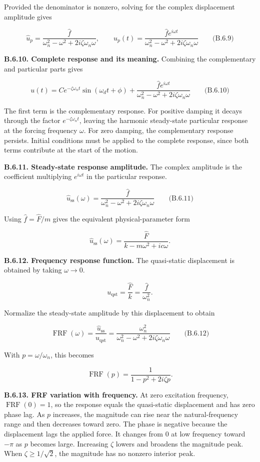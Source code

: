 Provided the denominator is nonzero, solving for the complex displacement amplitude gives

\[
\boxed{
\hat{u}_p=\frac{\hat{f}}
{\omega_n^2-\omega^2+2i\zeta\omega_n\omega},
\qquad
u_p(t)=\frac{\hat{f}e^{i\omega t}}
{\omega_n^2-\omega^2+2i\zeta\omega_n\omega}
}
\qquad\text{(B.6.9)}
\]

\textbf{B.6.10. Complete response and its meaning.} Combining the complementary and particular parts gives

\[
\boxed{
u(t)=Ce^{-\zeta\omega_nt}\sin(\omega_dt+\phi)
+\frac{\hat{f}e^{i\omega t}}
{\omega_n^2-\omega^2+2i\zeta\omega_n\omega}
}
\qquad\text{(B.6.10)}
\]

The first term is the complementary response. For positive damping it decays through the factor $e^{-\zeta\omega_nt}$, leaving the harmonic steady-state particular response at the forcing frequency $\omega$. For zero damping, the complementary response persists. Initial conditions must be applied to the complete response, since both terms contribute at the start of the motion.

\textbf{B.6.11. Steady-state response amplitude.} The complex amplitude is the coefficient multiplying $e^{i\omega t}$ in the particular response.

\[
\boxed{
\hat{u}_{\mathrm{ss}}(\omega)=
\frac{\hat{f}}
{\omega_n^2-\omega^2+2i\zeta\omega_n\omega}
}
\qquad\text{(B.6.11)}
\]

Using $\hat{f}=\hat{F}/m$ gives the equivalent physical-parameter form

\[
\hat{u}_{\mathrm{ss}}(\omega)=
\frac{\hat{F}}{k-m\omega^2+ic\omega}.
\]

\textbf{B.6.12. Frequency response function.} The quasi-static displacement is obtained by taking $\omega\to0$.

\[
u_{\mathrm{qst}}=\frac{\hat{F}}{k}=\frac{\hat{f}}{\omega_n^2}.
\]

Normalize the steady-state amplitude by this displacement to obtain

\[
\boxed{
\operatorname{FRF}(\omega)=\frac{\hat{u}_{\mathrm{ss}}}{u_{\mathrm{qst}}}
=\frac{\omega_n^2}
{\omega_n^2-\omega^2+2i\zeta\omega_n\omega}
}
\qquad\text{(B.6.12)}
\]

With $p=\omega/\omega_n$, this becomes

\[
\operatorname{FRF}(p)=\frac{1}{1-p^2+2i\zeta p}.
\]

\textbf{B.6.13. FRF variation with frequency.} At zero excitation frequency, $\operatorname{FRF}(0)=1$, so the response equals the quasi-static displacement and has zero phase lag. As $p$ increases, the magnitude can rise near the natural-frequency range and then decreases toward zero. The phase is negative because the displacement lags the applied force. It changes from $0$ at low frequency toward $-\pi$ as $p$ becomes large. Increasing $\zeta$ lowers and broadens the magnitude peak. When $\zeta\geq1/\sqrt{2}$, the magnitude has no nonzero interior peak.

